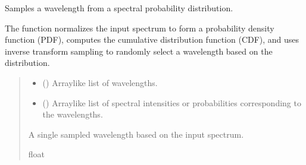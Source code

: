 \documentclass[letterpaper,10pt,english]{sphinxmanual}
\begin{document}
\begin{fulllineitems}
\label{\detokenize{generated/photon_canon.utils:photon_canon.utils.sample_spectrum}}
\pysigstartsignatures
\pysiglinewithargsret
{}
{\sphinxparamcomma {}}
{}
\pysigstopsignatures
\sphinxAtStartPar
Samples a wavelength from a spectral probability distribution.

\sphinxAtStartPar
The function normalizes the input spectrum to form a probability density function (PDF),
computes the cumulative distribution function (CDF), and uses inverse transform sampling
to randomly select a wavelength based on the distribution.
\begin{quote}\begin{description}
\begin{itemize}
\item {} 
\sphinxAtStartPar
{} (\sphinxstyleliteralemphasis{\sphinxupquote{{[}}}\sphinxstyleliteralemphasis{\sphinxupquote{{]}}}) \textendash{} Array\sphinxhyphen{}like list of wavelengths.

\item {} 
\sphinxAtStartPar
{} (\sphinxstyleliteralemphasis{\sphinxupquote{{[}}}\sphinxstyleliteralemphasis{\sphinxupquote{{]}}}) \textendash{} Array\sphinxhyphen{}like list of spectral intensities or probabilities corresponding to the wavelengths.

\end{itemize}

\sphinxAtStartPar
A single sampled wavelength based on the input spectrum.

\sphinxAtStartPar
float

\end{description}\end{quote}

\end{fulllineitems}

\end{document}

